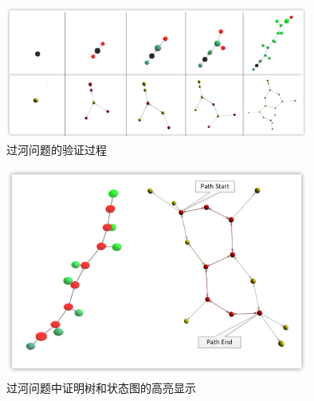 	\begin{figure}[h!]
		\centering
		\caption{过河问题的验证过程}
		\label{vmdv:river:step}
		\includegraphics[width=10cm]{Img/river_prooftreegraph_step.png}
		
	\end{figure}
	\begin{figure}[h!]
		\centering
		\caption{过河问题中证明树和状态图的高亮显示}
		\label{vmdv:river:path}
		\includegraphics[width=10cm]{Img/river_prooftreegraph_state_highlight.png}
		
	\end{figure}

